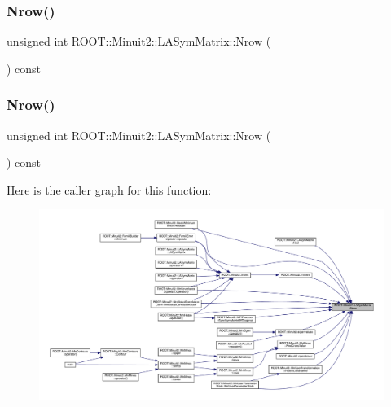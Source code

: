 \subsubsection{\texorpdfstring{Nrow()}{Nrow()}\hspace{0.1cm}{\footnotesize\ttfamily [1/2]}}
{\footnotesize\ttfamily unsigned int R\+O\+O\+T\+::\+Minuit2\+::\+L\+A\+Sym\+Matrix\+::\+Nrow (\begin{DoxyParamCaption}{ }\end{DoxyParamCaption}) const\hspace{0.3cm}{\ttfamily [inline]}}

\mbox{\label{classROOT_1_1Minuit2_1_1LASymMatrix_ac76b44933bc4b144b8671c089b8d7ef5}} 
\subsubsection{\texorpdfstring{Nrow()}{Nrow()}\hspace{0.1cm}{\footnotesize\ttfamily [2/2]}}
{\footnotesize\ttfamily unsigned int R\+O\+O\+T\+::\+Minuit2\+::\+L\+A\+Sym\+Matrix\+::\+Nrow (\begin{DoxyParamCaption}{ }\end{DoxyParamCaption}) const\hspace{0.3cm}{\ttfamily [inline]}}

Here is the caller graph for this function\+:\nopagebreak
\begin{figure}[H]
\begin{center}
\leavevmode
\includegraphics[width=350pt]{d3/d72/classROOT_1_1Minuit2_1_1LASymMatrix_ac76b44933bc4b144b8671c089b8d7ef5_icgraph}
\end{center}
\end{figure}
\mbox{\label{classROOT_1_1Minuit2_1_1LASymMatrix_a3a1a954a9e1ab78f255146ccd76d3847}} 
